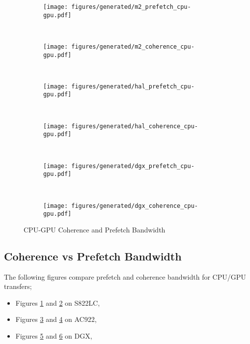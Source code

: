 \begin{figure}[ht]
	\centering
	\begin{subfigure}[b]{0.45\textwidth}
		\texttt{[image: figures/generated/m2\_prefetch\_cpu-gpu.pdf]}
		\caption{}
		\label{fig:um-prefetch-s822lc-cpu-gpu}
	\end{subfigure}
	~
	\begin{subfigure}[b]{0.45\textwidth}
		\texttt{[image: figures/generated/m2\_coherence\_cpu-gpu.pdf]}
		\caption{}
		\label{fig:um-coherence-s822lc-cpu-gpu}
	\end{subfigure}
	\\
	\begin{subfigure}[b]{0.45\textwidth}
		\texttt{[image: figures/generated/hal\_prefetch\_cpu-gpu.pdf]}
		\caption{}
		\label{fig:um-prefetch-ac922-cpu-gpu}
	\end{subfigure}
	~
	\begin{subfigure}[b]{0.45\textwidth}
		\texttt{[image: figures/generated/hal\_coherence\_cpu-gpu.pdf]}
		\caption{}
		\label{fig:um-coherence-ac922-cpu-gpu}
	\end{subfigure}
	\\
	\begin{subfigure}[b]{0.45\textwidth}
		\texttt{[image: figures/generated/dgx\_prefetch\_cpu-gpu.pdf]}
		\caption{}
		\label{fig:um-prefetch-dgx-cpu-gpu}
	\end{subfigure}
	~
	\begin{subfigure}[b]{0.45\textwidth}
		\texttt{[image: figures/generated/dgx\_coherence\_cpu-gpu.pdf]}
		\caption{}
		\label{fig:um-coherence-dgx-cpu-gpu}
	\end{subfigure}
	\caption[]{
		CPU-GPU Coherence and Prefetch Bandwidth
	}
	\label{fig:um-cpu-gpu}
\end{figure}



\subsection{Coherence vs Prefetch Bandwidth}
The following figures compare prefetch and coherence bandwidth for CPU/GPU transfers;
\begin{itemize}
	\item Figures \ref{fig:um-prefetch-s822lc-cpu-gpu} and \ref{fig:um-coherence-s822lc-cpu-gpu} on S822LC,
	\item Figures \ref{fig:um-prefetch-ac922-cpu-gpu} and \ref{fig:um-coherence-ac922-cpu-gpu}   on AC922,
	\item Figures \ref{fig:um-prefetch-dgx-cpu-gpu} and \ref{fig:um-coherence-dgx-cpu-gpu}       on DGX,
\end{itemize}


